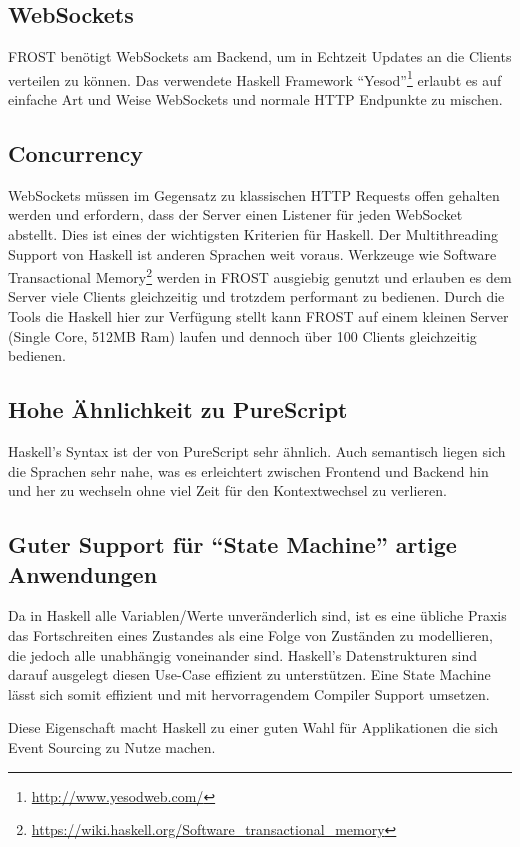 \subsection*{WebSockets}
FROST benötigt WebSockets am Backend, um in Echtzeit Updates an die Clients
verteilen zu können. Das verwendete Haskell Framework
``Yesod''\footnote{\url{http://www.yesodweb.com/}} erlaubt es auf einfache Art
und Weise WebSockets und normale HTTP Endpunkte zu mischen.

\subsection*{Concurrency}
WebSockets müssen im Gegensatz zu klassischen HTTP Requests offen gehalten
werden und erfordern, dass der Server einen Listener für jeden WebSocket
abstellt. Dies ist eines der wichtigsten Kriterien für Haskell. Der
Multithreading Support von Haskell ist anderen Sprachen weit voraus. Werkzeuge
wie Software Transactional
Memory\footnote{\url{https://wiki.haskell.org/Software_transactional_memory}}
werden in FROST ausgiebig genutzt und erlauben es dem Server viele Clients
gleichzeitig und trotzdem performant zu bedienen. Durch die Tools die Haskell
hier zur Verfügung stellt kann FROST auf einem kleinen Server (Single Core,
512MB Ram) laufen und dennoch über 100 Clients gleichzeitig bedienen.

\subsection*{Hohe Ähnlichkeit zu PureScript}
Haskell's Syntax ist der von PureScript sehr ähnlich. Auch semantisch liegen
sich die Sprachen sehr nahe, was es erleichtert zwischen Frontend und Backend
hin und her zu wechseln ohne viel Zeit für den Kontextwechsel zu verlieren.

\subsection*{Guter Support für ``State Machine'' artige Anwendungen}
Da in Haskell alle Variablen/Werte unveränderlich sind, ist es eine übliche
Praxis das Fortschreiten eines Zustandes als eine Folge von Zuständen zu
modellieren, die jedoch alle unabhängig voneinander sind. Haskell's
Datenstrukturen sind darauf ausgelegt diesen Use-Case effizient zu unterstützen.
Eine State Machine lässt sich somit effizient und mit hervorragendem Compiler
Support umsetzen.

Diese Eigenschaft macht Haskell zu einer guten Wahl für Applikationen die sich
Event Sourcing zu Nutze machen.

